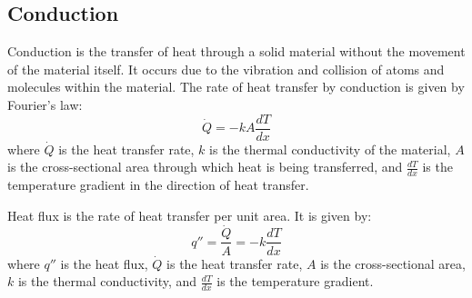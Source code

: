 \documentclass[11pt]{report}
\begin{document}
\subsection{Conduction}
\begin{definition}[Conduction]
    Conduction is the transfer of heat through a solid material without the movement of the material itself. It occurs due to the vibration and collision of atoms and molecules within the material. The rate of heat transfer by conduction is given by Fourier's law:
    \begin{equation}
        \dot{Q} = -k A \frac{dT}{dx}
    \end{equation}
    where $\dot{Q}$ is the heat transfer rate, $k$ is the thermal conductivity of the material, $A$ is the cross-sectional area through which heat is being transferred, and $\frac{dT}{dx}$ is the temperature gradient in the direction of heat transfer.
\end{definition}
\begin{definition}
    Heat flux is the rate of heat transfer per unit area. It is given by:
    \begin{equation}
        q'' = \frac{\dot{Q}}{A} = -k \frac{dT}{dx}
    \end{equation}
    where $q''$ is the heat flux, $\dot{Q}$ is the heat transfer rate, $A$ is the cross-sectional area, $k$ is the thermal conductivity, and $\frac{dT}{dx}$ is the temperature gradient.
    
\end{definition}
\end{document}
